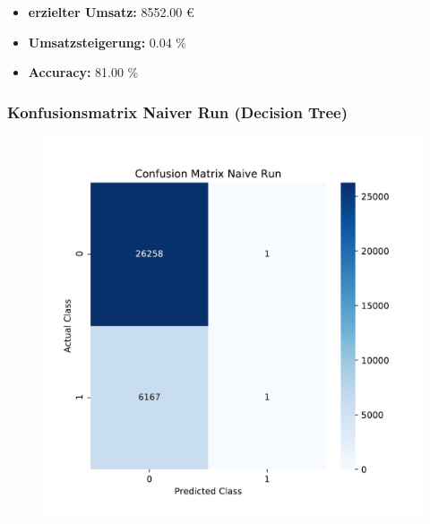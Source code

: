 \documentclass{beamer}
\begin{document}
\begin{frame}
\begin{footnotesize}
\begin{itemize}
\item  \textbf{erzielter Umsatz:} 8552.00 \euro{}
\item \textbf{Umsatzsteigerung:}	0.04 \% 
\item \textbf{Accuracy:} 81.00 \%
\end{itemize}
\end{footnotesize}

\frametitle{Konfusionsmatrix Naiver Run (Decision Tree)}
\begin{figure}
\begin{center}
\includegraphics[width=.5\textwidth]{pdf/confusion1.pdf}
\end{center}
\end{figure}
\end{frame}
\end{document}
